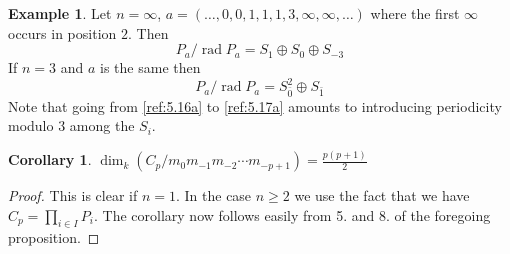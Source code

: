 \documentclass{amsproc}
\def\rad{\operatorname {rad}}
\newtheorem{corollarys}[lemmas]{Corollary}
\theoremstyle{definition}
\newtheorem{examples}[lemmas]{Example}
\theoremstyle{remark}
\numberwithin{equation}{section}
\numberwithin{table}{section}
\numberwithin{figure}{section}
\begin{document}
\begin{examples}
\label{ref:5.2.3a}
Let $n=\infty$, $a=(\ldots,0,0,1,1,1,3,\infty,\infty,\ldots)$ where the first
$\infty$ occurs in position $2$. Then 
\begin{equation}
\label{ref:5.16a}
P_a/\rad P_a= S_{1}\oplus S_{0}\oplus S_{-3}
\end{equation}
If $n=3$  and $a$ is the same then
\begin{equation}
\label{ref:5.17a}
P_a/\rad P_a= S_{\bar{0}}^2\oplus S_{\bar{1}}
\end{equation}
Note that going from \eqref{ref:5.16a} to \eqref{ref:5.17a} amounts to
introducing periodicity modulo $3$ among the $S_i$. 
\end{examples}
\begin{corollarys}
\label{ref:5.2.4a}
$\dim_k (C_p/m_0m_{-1}m_{-2}\cdots m_{-p+1})=\frac{p(p+1)}{2}$
\end{corollarys}
\begin{proof} This is clear if $n=1$. In the case $n\ge 2$ we use the
  fact that we have $C_p=\prod_{i\in I} P_i$. The corollary now
  follows easily from 5. and 8. of the foregoing proposition.
\end{proof}
\end{document}
